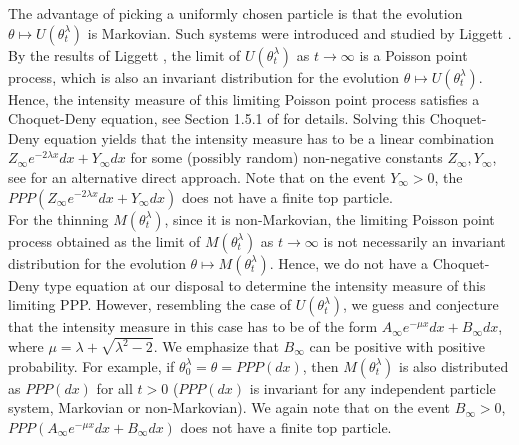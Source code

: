 \documentclass[a4paper,reqno]{amsart}%
\newcommand{\1}{\mathbf 1}
\theoremstyle{mine}
\numberwithin{theorem}{section}
\numberwithin{equation}{section}
\theoremstyle{remark}
\begin{document}
The advantage of picking a uniformly chosen particle is that the evolution $\theta \mapsto U(\theta_t^\lambda)$ is Markovian. Such systems were introduced and studied by Liggett \cite{Liggett}. By the results of Liggett \cite{Liggett}, the limit of $U(\theta_t^\lambda)$ as $t \to \infty$ is a Poisson point process, which is also an invariant distribution for the evolution $\theta \mapsto U(\theta_t^\lambda)$. Hence, the intensity measure of this limiting Poisson point process satisfies a Choquet-Deny equation, see Section 1.5.1 of \cite{Shekhar_FP} for details. Solving this Choquet-Deny equation yields that the intensity measure has to be a linear combination $Z_\infty e^{-2\lambda x} dx + Y_\infty dx$ for some (possibly random) non-negative constants $Z_\infty, Y_\infty$, see \cite{Shekhar_Liggett} for an alternative direct approach. Note that on the event $Y_\infty >0$, the $PPP(Z_\infty e^{-2\lambda x} dx + Y_\infty dx)$ does not have a finite top particle. \\

For the thinning $M(\theta_t^\lambda)$, since it is non-Markovian, the limiting Poisson point process obtained as the limit of $M(\theta_t^\lambda)$ as $t\to \infty$ is not necessarily an invariant distribution for the evolution $\theta \mapsto M(\theta_t^\lambda)$. Hence, we do not have a Choquet-Deny type equation at our disposal to determine the intensity measure of this limiting PPP. However, resembling the case of $U(\theta_t^\lambda)$, we guess and conjecture that the intensity measure in this case has to be of the form $A_\infty e^{-\mu x} dx + B_\infty dx$, where $\mu = \lambda + \sqrt{\lambda^2 -2}$. We emphasize that $B_\infty$ can be positive with positive probability. For example, if $\theta_0^\lambda =\theta = PPP(dx)$, then $M(\theta_t^\lambda)$ is also distributed as $PPP(dx)$ for all $t>0$ ($PPP(dx)$ is invariant for any independent particle system, Markovian or non-Markovian). We again note that on the event $B_\infty >0$, $PPP(A_\infty e^{-\mu x} dx + B_\infty dx)$ does not have a finite top particle. \\
\end{document}
